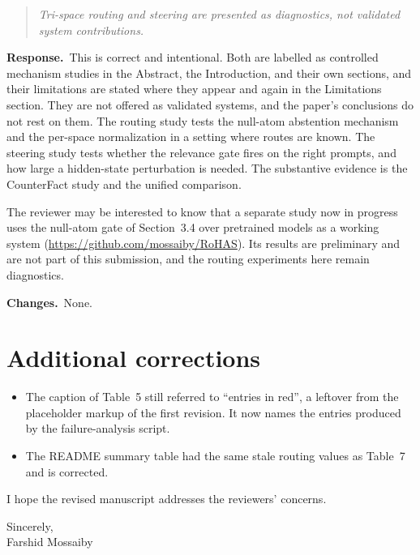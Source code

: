 \documentclass[11pt]{article}
\newenvironment{reviewer}{\par\medskip\noindent\begin{quote}\itshape}{\end{quote}}
\newcommand{\response}{\par\noindent\textbf{Response.}\ }
\newcommand{\changes}{\par\smallskip\noindent\textbf{Changes.}\ }
\begin{document}
\begin{reviewer}
Tri-space routing and steering are presented as diagnostics, not validated system contributions.
\end{reviewer}

\response This is correct and intentional. Both are labelled as controlled mechanism studies in the Abstract, the Introduction, and their own sections, and their limitations are stated where they appear and again in the Limitations section. They are not offered as validated systems, and the paper's conclusions do not rest on them. The routing study tests the null-atom abstention mechanism and the per-space normalization in a setting where routes are known. The steering study tests whether the relevance gate fires on the right prompts, and how large a hidden-state perturbation is needed. The substantive evidence is the CounterFact study and the unified comparison.

The reviewer may be interested to know that a separate study now in progress uses the null-atom gate of Section~3.4 over pretrained models as a working system (\url{https://github.com/mossaiby/RoHAS}). Its results are preliminary and are not part of this submission, and the routing experiments here remain diagnostics.

\changes None.

\section*{Additional corrections}
\begin{itemize}[leftmargin=*]
\item The caption of Table~5 still referred to ``entries in red'', a leftover from the placeholder markup of the first revision. It now names the entries produced by the failure-analysis script.
\item The README summary table had the same stale routing values as Table~7 and is corrected.
\end{itemize}

I hope the revised manuscript addresses the reviewers' concerns.

Sincerely,\\
Farshid Mossaiby
\end{document}
